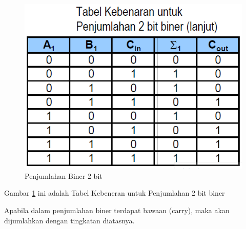 	\begin{figure} [ht]
	\centerline{\includegraphics[width=1\textwidth]{figures/Biner2angka.png}}
	\caption{Penjumlahan Biner 2 bit}
	\label{Biner2angka}
	\end{figure}
Gambar \ref{Biner2angka} ini adalah Tabel Kebeneran untuk Penjumlahan 2 bit biner

Apabila dalam penjumlahan biner terdapat bawaan (carry), maka akan dijumlahkan dengan tingkatan diatasnya.

\cite{wang201140}
\cite{brent1970addition}
\cite{detmer2001introduction}
\cite{nurhayati2010aritmatik}
\cite{dosen2013matematika}
